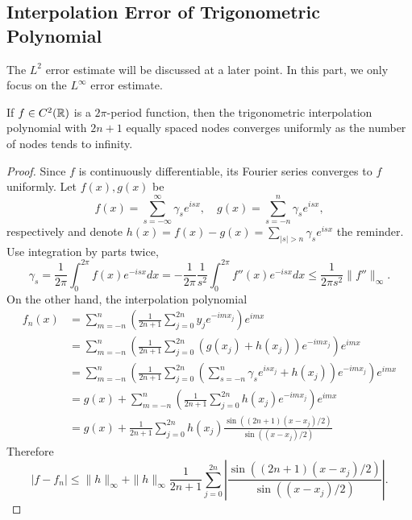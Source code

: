\subsection{Interpolation Error of Trigonometric Polynomial}
The $L^2$ error estimate will be discussed at a later point. In this part, we only focus on the $L^{\infty}$ error estimate.
\begin{theorem}
    If $f\in C^2(\mathbb R)$ is a $2\pi$-period function, then the trigonometric interpolation polynomial with $2n+1$ equally spaced nodes converges uniformly as the number of nodes tends to infinity.
\end{theorem}
\begin{proof}
    Since $f$ is continuously differentiable, its Fourier series converges to $f$ uniformly. Let $f(x), g(x)$ be
    $$f(x) = \sum_{s = -\infty}^{\infty} \gamma_s e^{is x},\quad g(x) = \sum_{s = -n}^n \gamma_s e^{is x},$$
    respectively and denote $h(x) = f(x)- g(x) = \sum_{|s| > n} \gamma_s e^{isx}$ the reminder. Use integration by parts twice,
    \begin{equation}
        \gamma_s = \frac{1}{2\pi}\int_{0}^{2\pi} f(x) e^{-isx} dx = -\frac{1}{2\pi}\frac{1}{s^2}\int_{0}^{2\pi} f''(x) e^{-isx} dx \le \frac{1}{2\pi s^2}\|f''\|_{\infty}.
    \end{equation}
    On the other hand, the interpolation polynomial 
    \begin{equation}
        \begin{aligned}
            f_n(x)& = \sum_{m=-n}^n \left(\frac{1}{2n+1}\sum_{j=0}^{2n} y_j e^{-im x_j}\right) e^{im x}  \\
             &=\sum_{m=-n}^n \left(\frac{1}{2n+1}\sum_{j=0}^{2n} ( g(x_j) + h(x_j) ) e^{-im x_j}\right) e^{im x} \\
             &= \sum_{m=-n}^n \left(\frac{1}{2n+1}\sum_{j=0}^{2n} ( \sum_{s = -n}^n \gamma_s  e^{is x_j }+ h(x_j) ) e^{-im x_j}\right) e^{im x} \\
             &=g(x)+ \sum_{m=-n}^n \left(\frac{1}{2n+1}\sum_{j=0}^{2n} h(x_j) e^{-im x_j}\right)e^{im x} \\
             &=g(x)+ \frac{1}{2n+1} \sum_{j=0}^{2n} h(x_j) \frac{\sin((2n+1)(x-x_j)/2)}{\sin((x-x_j)/2)}
        \end{aligned}
    \end{equation}
    Therefore 
    \begin{equation}\label{EQ: DIFF}
        |f - f_n| \le \|h\|_{\infty} + \|h\|_{\infty}  \frac{1}{2n+1} \sum_{j=0}^{2n} \left|\frac{\sin((2n+1)(x-x_j)/2)}{\sin((x-x_j)/2)}\right|.

\end{equation}
\end{proof}
